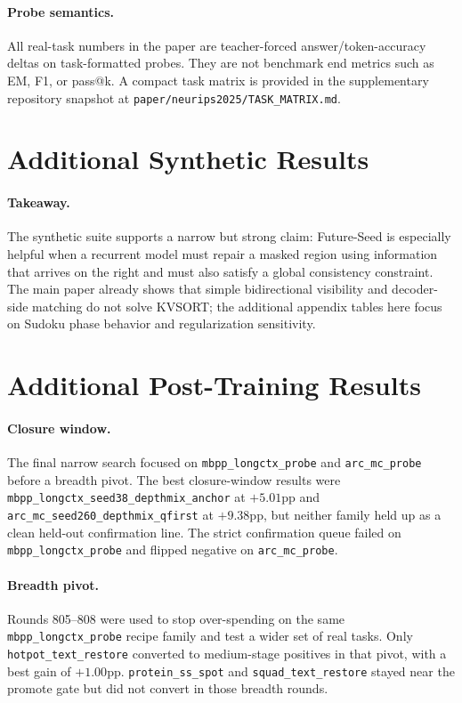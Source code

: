 \paragraph{Probe semantics.}
All real-task numbers in the paper are teacher-forced answer/token-accuracy deltas on task-formatted probes. They are not benchmark end metrics such as EM, F1, or pass@k. A compact task matrix is provided in the supplementary repository snapshot at \texttt{paper/neurips2025/TASK\_MATRIX.md}.

\section{Additional Synthetic Results}



\paragraph{Takeaway.}
The synthetic suite supports a narrow but strong claim: Future-Seed is especially helpful when a recurrent model must repair a masked region using information that arrives on the right and must also satisfy a global consistency constraint. The main paper already shows that simple bidirectional visibility and decoder-side matching do not solve KVSORT; the additional appendix tables here focus on Sudoku phase behavior and regularization sensitivity.

\section{Additional Post-Training Results}


\paragraph{Closure window.}
The final narrow search focused on \texttt{mbpp\_longctx\_probe} and \texttt{arc\_mc\_probe} before a breadth pivot. The best closure-window results were \texttt{mbpp\_longctx\_seed38\_depthmix\_anchor} at $+5.01$pp and \texttt{arc\_mc\_seed260\_depthmix\_qfirst} at $+9.38$pp, but neither family held up as a clean held-out confirmation line. The strict confirmation queue failed on \texttt{mbpp\_longctx\_probe} and flipped negative on \texttt{arc\_mc\_probe}.

\paragraph{Breadth pivot.}
Rounds 805--808 were used to stop over-spending on the same \texttt{mbpp\_longctx\_probe} recipe family and test a wider set of real tasks. Only \texttt{hotpot\_text\_restore} converted to medium-stage positives in that pivot, with a best gain of $+1.00$pp. \texttt{protein\_ss\_spot} and \texttt{squad\_text\_restore} stayed near the promote gate but did not convert in those breadth rounds.

